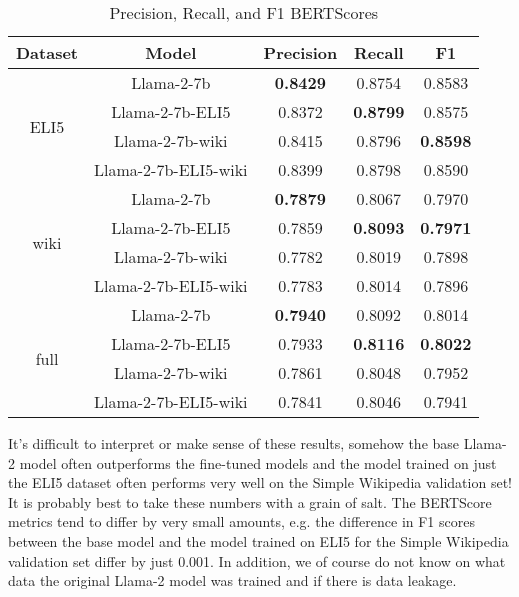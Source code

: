 \documentclass[11pt, oneside]{article}   	%
\begin{document}
\begin{table}[htbp]
\centering
\begin{tabular}{ccccc}
\toprule
\textbf{Dataset} & \textbf{Model} & \textbf{Precision} & \textbf{Recall} & \textbf{F1} \\
\midrule
\multirow{4}{*}{ELI5} & Llama-2-7b & \textbf{0.8429} & 0.8754 & 0.8583 \\
& Llama-2-7b-ELI5 & 0.8372 & \textbf{0.8799} & 0.8575 \\
& Llama-2-7b-wiki & 0.8415 & 0.8796 & \textbf{0.8598} \\
& Llama-2-7b-ELI5-wiki & 0.8399 & 0.8798 & 0.8590 \\
\midrule
\multirow{4}{*}{wiki} & Llama-2-7b & \textbf{0.7879} & 0.8067 & 0.7970 \\
& Llama-2-7b-ELI5 & 0.7859 & \textbf{0.8093} & \textbf{0.7971} \\
& Llama-2-7b-wiki & 0.7782 & 0.8019 & 0.7898 \\
& Llama-2-7b-ELI5-wiki & 0.7783 & 0.8014 & 0.7896 \\
\midrule
\multirow{4}{*}{full} & Llama-2-7b & \textbf{0.7940} & 0.8092 & 0.8014 \\
& Llama-2-7b-ELI5 & 0.7933 & \textbf{0.8116} & \textbf{0.8022} \\
& Llama-2-7b-wiki  & 0.7861 & 0.8048 & 0.7952 \\
& Llama-2-7b-ELI5-wiki & 0.7841 & 0.8046 & 0.7941 \\
\bottomrule
\end{tabular}
\caption{Precision, Recall, and F1 BERTScores}
\label{tab:scores}
\end{table}

It's difficult to interpret or make sense of these results, somehow the base Llama-2 model often outperforms the fine-tuned models and the model trained on just the ELI5 dataset often performs very well on the Simple Wikipedia validation set!
It is probably best to take these numbers with a grain of salt. The BERTScore metrics tend to differ by very small amounts, e.g. the difference in F1 scores between the base model and the model trained on ELI5 for the Simple Wikipedia validation set differ by just 0.001.
In addition, we of course do not know on what data the original Llama-2 model was trained and if there is data leakage.
\end{document}
